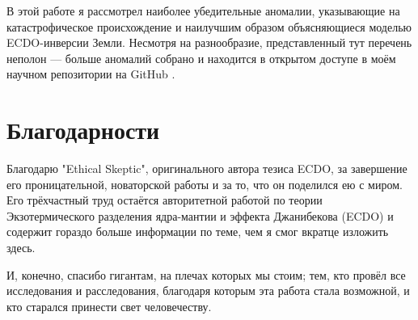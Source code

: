 \documentclass[10pt,twocolumn,letterpaper]{article}
\begin{document}
В этой работе я рассмотрел наиболее убедительные аномалии, указывающие на катастрофическое происхождение и наилучшим образом объясняющиеся моделью ECDO-инверсии Земли. Несмотря на разнообразие, представленный тут перечень неполон — больше аномалий собрано и находится в открытом доступе в моём научном репозитории на GitHub \cite{2}.

\section{Благодарности}

Благодарю "Ethical Skeptic", оригинального автора тезиса ECDO, за завершение его проницательной, новаторской работы и за то, что он поделился ею с миром. Его трёхчастный труд \cite{1} остаётся авторитетной работой по теории Экзотермического разделения ядра-мантии и эффекта Джанибекова (ECDO) и содержит гораздо больше информации по теме, чем я смог вкратце изложить здесь.

И, конечно, спасибо гигантам, на плечах которых мы стоим; тем, кто провёл все исследования и расследования, благодаря которым эта работа стала возможной, и кто старался принести свет человечеству.

\clearpage
\twocolumn

{\small


}
\end{document}
